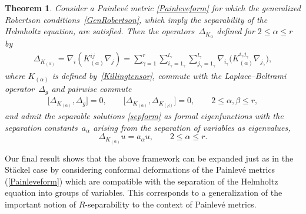\documentclass[pdftex]{sigma}
\numberwithin{equation}{section}
\newtheorem{Theorem}{Theorem}[section]
\begin{document}
\begin{Theorem}\label{maintheorem2} Consider a Painlev\'e metric \eqref{Painleveform} for which the generalized Robertson conditions~\eqref{GenRobertson}, which imply the separability of the Helmholtz equation, are satisfied. Then the operators~$\Delta_{K_{\alpha}}$ defined for $2\leq \alpha \leq r$ by
\begin{gather}\label{KLaplacian}
\Delta_{K_{(\alpha)}}=\nabla_{i}(K_{(\alpha)}^{ij}\nabla_{j})=\sum_{\gamma=1}^{r}\sum_{i_{\gamma} =1_{\gamma}}^{l_{\gamma}}\sum_{j_{\gamma}=1_{\gamma}}^{l_{\gamma}}\nabla_{i_{\gamma}}\big(K_{(\alpha)}^{i_{\gamma}j_{\gamma}}\nabla_{j_{\gamma}}\big),
\end{gather}
where $K_{(\alpha)}$ is defined by~\eqref{Killingtensor},
commute with the Laplace--Beltrami opera\-tor~$\Delta_{g}$ and pairwise commute
\begin{gather}\label{commrelKill}
\big[\Delta_{K_{(\alpha)}},\Delta_{g}\big]=0,\qquad \big[\Delta_{K_{(\alpha)}},\Delta_{K_{(\beta)}}\big]=0,\qquad 2\leq \alpha,\beta \leq r,
\end{gather}
and admit the separable solutions \eqref{sepform} as formal eigenfunctions with the separation cons\-tants~$a_{\alpha}$ arising from the separation of variables as eigenvalues,
\[
\Delta_{K_{(\alpha)}}u=a_{\alpha}u,\qquad 2\leq \alpha \leq r.
\]
\end{Theorem}
Our final result shows that the above framework can be expanded just as in the St\"ackel case by considering conformal deformations of the Painlev\'e metrics (\ref{Painleveform}) which are compatible with the separation of the Helmholtz equation into groups of variables. This corresponds to a generalization of the important notion of $R$-separability \cite{BCR2005, CR2006, KaMi1984} to the context of Painlev\'e metrics.
\end{document}
